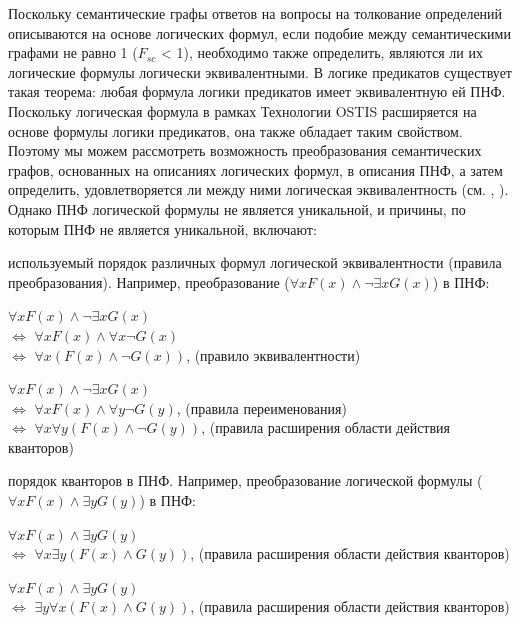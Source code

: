 Поскольку семантические графы ответов на вопросы на толкование определений описываются на основе логических формул, если подобие между семантическими графами не равно 1 ($F_{sc}$ < 1), необходимо также определить, являются ли их логические формулы логически эквивалентными. В логике предикатов существует такая теорема: любая формула логики предикатов имеет эквивалентную ей ПНФ. Поскольку логическая формула в рамках Технологии OSTIS расширяется на основе формулы логики предикатов, она также обладает таким свойством. Поэтому мы можем рассмотреть возможность преобразования семантических графов, основанных на описаниях логических формул, в описания ПНФ, а затем определить, удовлетворяется ли между ними логическая эквивалентность (см. , ). Однако ПНФ логической формулы не является уникальной, и причины, по которым ПНФ не является уникальной, включают:

\begin{textitemize}
	\item используемый порядок различных формул логической эквивалентности (правила преобразования). Например, преобразование ($\forall x F(x) \land \neg \exists x G(x)$) в ПНФ:
	
	\begin{textitemize}
		\item $\forall x F(x) \land \neg \exists x G(x)$ \\ $\Leftrightarrow$ $\forall x F(x) \land \forall x \neg G(x)$ \\ $\Leftrightarrow$ $\forall x (F(x) \land \neg G(x)) $, (правило эквивалентности) 
		\item $\forall x F(x) \land \neg \exists x G(x)$ \\ $\Leftrightarrow$ $\forall x F(x) \land  \forall y \neg G(y)$, (правила переименования) \\ $\Leftrightarrow$ $\forall x \forall y (F(x) \land \neg G(y)) $, (правила расширения области действия кванторов)
	\end{textitemize}
	
	\item порядок кванторов в ПНФ. Например, преобразование логической формулы ($\forall x F(x)\wedge \exists y G(y)$) в ПНФ:
	
	\begin{textitemize}
		\item $\forall x F(x)\wedge \exists y G(y)$ \\
		$\Leftrightarrow$ $\forall x \exists y (F(x) \wedge G(y))$, (правила расширения области действия кванторов)
		\item $\forall x F(x)\wedge \exists y G(y)$ \\
		$\Leftrightarrow$ $\exists y \forall x (F(x) \wedge G(y))$, (правила расширения области действия кванторов)
	\end{textitemize}
	
\end{textitemize}

